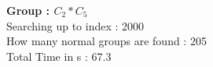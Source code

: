 \textbf{Group : $C_2*C_5$}\\
Searching up to index : 2000\\
How many normal groups are found : 205\\
Total Time in s : 67.3\\
